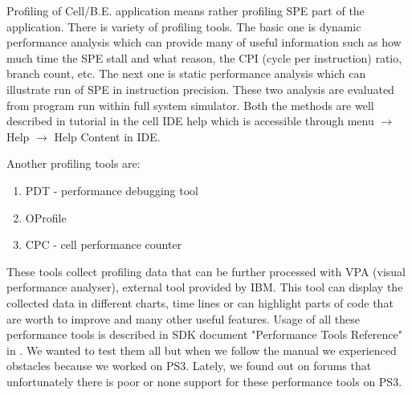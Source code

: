 \par
Profiling of \mbox{Cell/B.E.} application means rather profiling SPE part of the application.
There is variety of profiling tools.
The basic one is dynamic performance analysis which can provide many of useful information such as how much time the SPE stall and what reason, the CPI (cycle per instruction) ratio, branch count, etc.
The next one is static performance analysis which can illustrate run of SPE in instruction precision.
These two analysis are evaluated from program run within full system simulator.
Both the methods are well described in tutorial in the cell IDE help which is accessible through menu $\rightarrow$ Help $\rightarrow$ Help Content in IDE.

\par
Another profiling tools are:
\begin{enumerate}
\item{PDT - performance debugging tool}
\item{OProfile}
\item{CPC - cell performance counter}
\end{enumerate}

These tools collect profiling data that can be further processed with VPA (visual performance analyser), external tool provided by IBM.
This tool can display the collected data in different charts, time lines or can highlight parts of code that are worth to improve and many other useful features.
Usage of all these performance tools is described in SDK document "Performance Tools Reference" in \cite{performanceToolRef}.
We wanted to test them all but when we follow the manual we experienced obstacles because we worked on PS3.
Lately, we found out on forums that unfortunately there is poor or none support for these performance tools on PS3.
